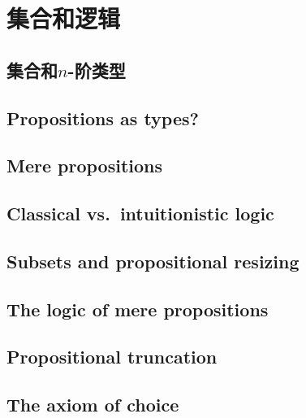 \chapter{集合和逻辑}
\label{cha:logic}


\section{集合和\texorpdfstring{$n$}{n}-阶类型}
\label{sec:basics-sets}


\section{Propositions as types?}
\label{subsec:pat?}


\section{Mere propositions}
\label{subsec:hprops}


\section{Classical vs.\ intuitionistic logic}
\label{sec:intuitionism}


\section{Subsets and propositional resizing}
\label{subsec:prop-subsets}


\section{The logic of mere propositions}
\label{subsec:logic-hprop}


\section{Propositional truncation}
\label{subsec:prop-trunc}


\section{The axiom of choice}
\label{sec:axiom-choice}



